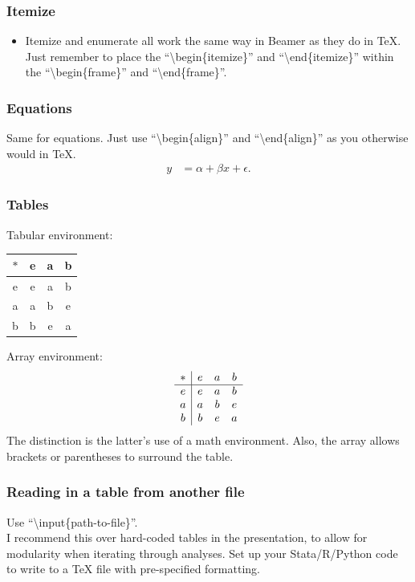 \documentclass{beamer}
\begin{document}
\begin{frame}
\frametitle{Itemize}
\begin{itemize}
	\item Itemize and enumerate all work the same way in Beamer as they do in TeX. Just remember to place the ``\textbackslash begin\{itemize\}'' and ``\textbackslash end\{itemize\}'' within the ``\textbackslash begin\{frame\}'' and ``\textbackslash end\{frame\}''.
\end{itemize}
\end{frame}

\begin{frame}
\frametitle{Equations}
Same for equations. Just use ``\textbackslash begin\{align\}'' and ``\textbackslash end\{align\}'' as you otherwise would in TeX.
\begin{align*}	
	y &= \alpha + \beta x + \epsilon	.
\end{align*}	
\end{frame}

\begin{frame}
\frametitle{Tables}
Tabular environment:
\begin{center}
  \begin{tabular}{ c | c  c  c }
    $\ast$ & e & a & b \\ \hline
    e & e & a & b \\ 
    a & a & b & e \\ 
    b & b & e & a
  \end{tabular}
\end{center} 
Array environment:
\[ 
\begin{array}{c | c c c}
    \ast & e & a & b \\ \hline
    e & e & a & b \\ 
    a & a & b & e \\ 
    b & b & e & a
 \end{array} 
\] 
The distinction is the latter's use of a math environment. Also, the array allows brackets or parentheses to surround the table.
\end{frame}

\begin{frame}
\frametitle{Reading in a table from another file}
Use ``\textbackslash input\{path-to-file\}''. 
\\[1em]
I recommend this over hard-coded tables in the presentation, to allow for modularity when iterating through analyses. Set up your Stata/R/Python code to write to a TeX file with pre-specified formatting.
\begin{table}
	\centering
	\scriptsize{
	
	}
\end{table}
\end{frame}
\end{document}

